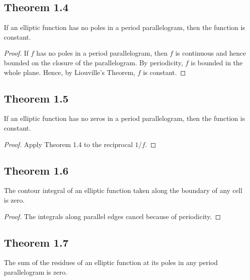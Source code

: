 \subsection*{Theorem 1.4}

\begin{proposition}[]
    If an elliptic function has no poles in a period parallelogram, then the function is constant.
\end{proposition}

\begin{proof}
    If $f$ has no poles in a period parallelogram, then $f$ is continuous and hence bounded on the closure of the
    parallelogram. By periodicity, $f$ is bounded in the whole plane. Hence, by Liouville's Theorem, $f$ is constant.
\end{proof}


\subsection*{Theorem 1.5}

\begin{proposition}[]
    If an elliptic function has no zeros in a period parallelogram, then the function is constant.
\end{proposition}

\begin{proof}
    Apply Theorem 1.4 to the reciprocal $1/f$.
\end{proof}


\subsection*{Theorem 1.6}

\begin{proposition}[]
    The contour integral of an elliptic function taken along the boundary of any cell is zero.
\end{proposition}

\begin{proof}
    The integrals along parallel edges cancel because of periodicity.
\end{proof}


\subsection*{Theorem 1.7}

\begin{proposition}[]
    The sum of the residues of an elliptic function at its poles in any period parallelogram is zero.
\end{proposition}

